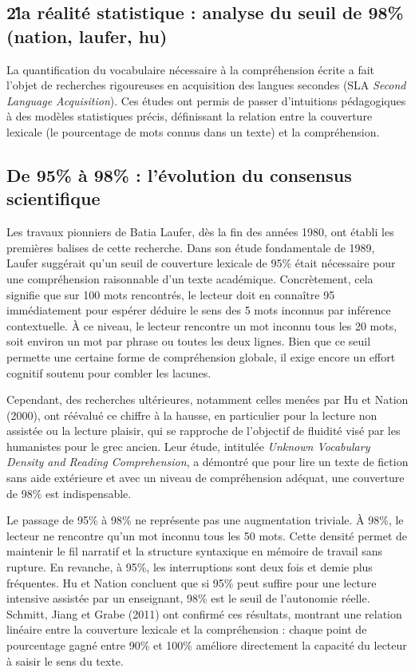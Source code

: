{\subsection{2\. la réalité statistique : analyse du seuil de 98\% (nation, laufer, hu)}

La quantification du vocabulaire nécessaire à la compréhension écrite a fait l'objet de recherches
rigoureuses en acquisition des langues secondes (SLA \- \textit{Second Language Acquisition}). Ces
études ont permis de passer d'intuitions pédagogiques à des modèles statistiques précis, définissant
la relation entre la couverture lexicale (le pourcentage de mots connus dans un texte) et la
compréhension.



\subsection{De 95\% à 98\% : l'évolution du consensus scientifique}

Les travaux pionniers de Batia Laufer, dès la fin des années 1980, ont établi les premières balises
de cette recherche. Dans son étude fondamentale de 1989, Laufer suggérait qu'un seuil de couverture
lexicale de 95\% était nécessaire pour une compréhension \og raisonnable\fg{} d'un texte
académique.\cite{II-3-2-ref1} Concrètement, cela signifie que sur 100 mots rencontrés, le lecteur
doit en connaître 95 immédiatement pour espérer déduire le sens des 5 mots inconnus par inférence
contextuelle. À ce niveau, le lecteur rencontre un mot inconnu tous les 20 mots, soit environ un mot
par phrase ou toutes les deux lignes. Bien que ce seuil permette une certaine forme de compréhension
globale, il exige encore un effort cognitif soutenu pour combler les lacunes.\cite{II-3-2-ref2}

Cependant, des recherches ultérieures, notamment celles menées par Hu et Nation (2000), ont réévalué
ce chiffre à la hausse, en particulier pour la lecture \og non assistée\fg{} ou la lecture plaisir,
qui se rapproche de l'objectif de fluidité visé par les humanistes pour le grec ancien. Leur étude,
intitulée \textit{Unknown Vocabulary Density and Reading Comprehension}, a démontré que pour lire un
texte de fiction sans aide extérieure et avec un niveau de compréhension adéquat, une couverture de
98\% est indispensable.\cite{II-3-2-ref4}

Le passage de 95\% à 98\% ne représente pas une augmentation triviale. À 98\%, le lecteur ne
rencontre qu'un mot inconnu tous les 50 mots. Cette densité permet de maintenir le fil narratif et
la structure syntaxique en mémoire de travail sans rupture. En revanche, à 95\%, les interruptions
sont deux fois et demie plus fréquentes. Hu et Nation concluent que si 95\% peut suffire pour une
lecture intensive assistée par un enseignant, 98\% est le seuil de l'autonomie
réelle.\cite{II-3-2-ref6} Schmitt, Jiang et Grabe (2011) ont confirmé ces résultats, montrant une
relation linéaire entre la couverture lexicale et la compréhension : chaque point de pourcentage
gagné entre 90\% et 100\% améliore directement la capacité du lecteur à saisir le sens du
texte.\cite{II-3-2-ref7}



}
